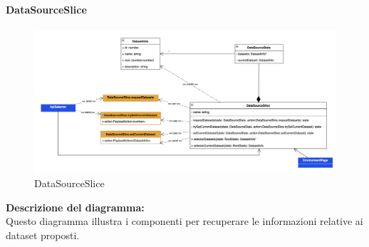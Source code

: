 \paragraph{DataSourceSlice}
\begin{figure}[h!] \centering
      \includegraphics[scale=0.4]{template/images/uml_front/logic/DataSourceSlice.png}
      \caption{DataSourceSlice}
\end{figure}
\textbf{Descrizione del diagramma:}\\
Questo diagramma illustra i componenti per recuperare le informazioni relative ai dataset proposti.
